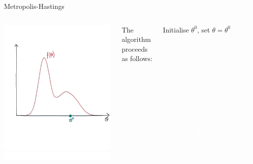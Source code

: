\documentclass[compress]{beamer}
\begin{document}
\begin{frame}[label=sec-7-2]{Metropolis-Hastings}
    \begin{columns}[c] 
    \includegraphics[width=1\linewidth]{MH1}

    The algorithm proceeds as follows:\\
    \begin{enumerate}
        \item Initialise $\theta^{0}$, set $\theta = \theta^{0}$
        \textcolor{white}{
            \item[\color{white}] Sample $\theta^* \sim q(\theta^*|\theta)$
            \item[\color{white}] Compute acceptance probability, r
            \item[\color{white}] Draw $u \sim Uniform[0,1]$
            \item[\color{white}] Set new sample to 
            \[
               \theta^{(s+1)} = 
               \begin{cases}
                \theta^*, & \text{if } u < r\\
                \theta^{(s)}, & \text{if } u \geqslant r
            \end{cases}
        \]
        \item[\color{white}] Repeat steps 2-5
    }
\end{enumerate}
\end{columns}
\end{frame}
\end{document}
